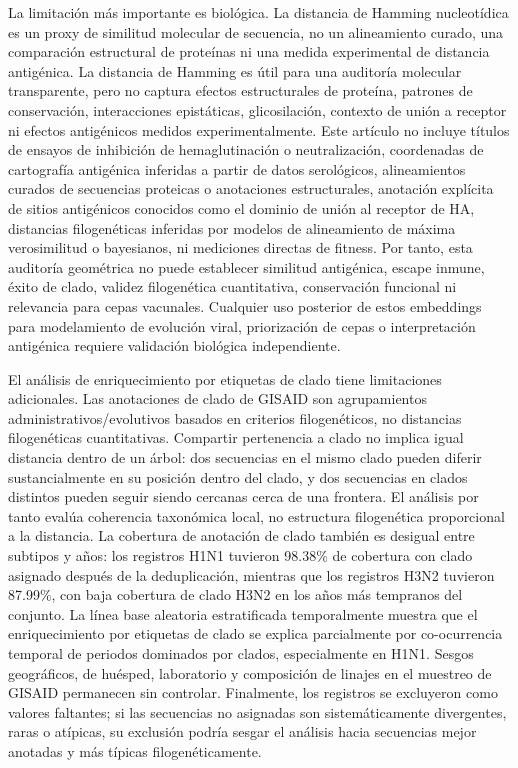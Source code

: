 \documentclass[11pt]{article}
\begin{document}
La limitación más importante es biológica. La distancia de Hamming nucleotídica es un proxy de similitud molecular de secuencia, no un alineamiento curado, una comparación estructural de proteínas ni una medida experimental de distancia antigénica. La distancia de Hamming es útil para una auditoría molecular transparente, pero no captura efectos estructurales de proteína, patrones de conservación, interacciones epistáticas, glicosilación, contexto de unión a receptor ni efectos antigénicos medidos experimentalmente. Este artículo no incluye títulos de ensayos de inhibición de hemaglutinación o neutralización, coordenadas de cartografía antigénica inferidas a partir de datos serológicos, alineamientos curados de secuencias proteicas o anotaciones estructurales, anotación explícita de sitios antigénicos conocidos como el dominio de unión al receptor de HA, distancias filogenéticas inferidas por modelos de alineamiento de máxima verosimilitud o bayesianos, ni mediciones directas de fitness. Por tanto, esta auditoría geométrica no puede establecer similitud antigénica, escape inmune, éxito de clado, validez filogenética cuantitativa, conservación funcional ni relevancia para cepas vacunales. Cualquier uso posterior de estos embeddings para modelamiento de evolución viral, priorización de cepas o interpretación antigénica requiere validación biológica independiente.

El análisis de enriquecimiento por etiquetas de clado tiene limitaciones adicionales. Las anotaciones de clado de GISAID son agrupamientos administrativos/evolutivos basados en criterios filogenéticos, no distancias filogenéticas cuantitativas. Compartir pertenencia a clado no implica igual distancia dentro de un árbol: dos secuencias en el mismo clado pueden diferir sustancialmente en su posición dentro del clado, y dos secuencias en clados distintos pueden seguir siendo cercanas cerca de una frontera. El análisis por tanto evalúa coherencia taxonómica local, no estructura filogenética proporcional a la distancia. La cobertura de anotación de clado también es desigual entre subtipos y años: los registros H1N1 tuvieron 98.38\% de cobertura con clado asignado después de la deduplicación, mientras que los registros H3N2 tuvieron 87.99\%, con baja cobertura de clado H3N2 en los años más tempranos del conjunto. La línea base aleatoria estratificada temporalmente muestra que el enriquecimiento por etiquetas de clado se explica parcialmente por co-ocurrencia temporal de periodos dominados por clados, especialmente en H1N1. Sesgos geográficos, de huésped, laboratorio y composición de linajes en el muestreo de GISAID permanecen sin controlar. Finalmente, los registros  se excluyeron como valores faltantes; si las secuencias no asignadas son sistemáticamente divergentes, raras o atípicas, su exclusión podría sesgar el análisis hacia secuencias mejor anotadas y más típicas filogenéticamente.
\end{document}
